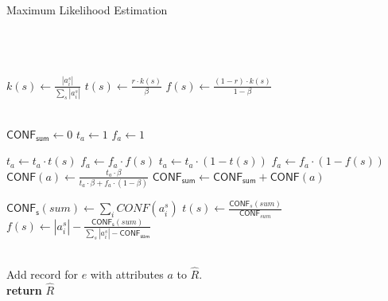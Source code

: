 \documentclass{acm_proc_article-sp}
\begin{document}
\begin{algorithm}
\caption{Maximum Likelihood Estimation}
\begin{algorithmic}[1]
\small
{} \\
 \\
 \\


\State $ k(s) \leftarrow \frac{|a_i^s|}{\sum_s|a_i^s|} $
\State $ t(s) \leftarrow \frac{r  \cdot k(s)}{\beta} $
\State $ f(s) \leftarrow \frac{(1-r) \cdot k(s)}{1-\beta} $
\EndFor

\\
\State $\mathsf{CONF_{sum}} \leftarrow 0 $
\State $ t_a \leftarrow 1 $
\State $ f_a \leftarrow 1 $

\State $ t_a \leftarrow t_a  \cdot t(s) $
\State $ f_a \leftarrow f_a   \cdot f(s) $
\Else
\State $ t_a \leftarrow t_a  \cdot (1-t(s)) $
\State $ f_a \leftarrow f_a   \cdot (1-f(s)) $
\EndIf
\EndFor
\State $ \mathsf{CONF}(a) \leftarrow \frac{t_a \cdot \beta}{t_a \cdot \beta + f_a \cdot (1-\beta)} $
\State $\mathsf{CONF_{sum}} \leftarrow \mathsf{CONF_{sum}} + \mathsf{CONF}(a) $
\EndFor
\EndFor

\State $\mathsf{CONF_s}(sum) \leftarrow \sum_i CONF(a_i^s)  $
\State $ t(s) \leftarrow \frac{\mathsf{CONF}_s(sum)}{\mathsf{CONF}_{sum}}  $
\State $ f(s) \leftarrow  |a_i^s| - \frac{\mathsf{CONF_s}(sum)}{\sum_s|a_i^s| - \mathsf{CONF_{sum}}}  $
\EndFor


\EndWhile

\\

  \State Add record for $e$ with attributes $a$ to $\hat{R}$.
\EndIf
\EndFor
\EndFor
\\

\State \textbf{return} $\hat{R}$
\EndFunction
\end{algorithmic}
\label{alg:ml}
\end{algorithm}  
\end{document}
